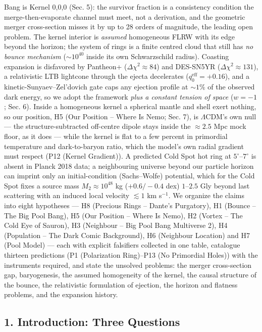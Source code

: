 \documentclass[
  11pt,
]{article}
\begin{document}
Bang is Kernel 0,0,0 (Sec. 5): the survivor fraction is a consistency
condition the merge-then-evaporate channel must meet, not a derivation,
and the geometric merger cross-section misses it by up to 28 orders of
magnitude, the leading open problem. The kernel interior is
\emph{assumed} homogeneous FLRW with its edge beyond the horizon; the
system of rings is a finite centred cloud that still has \emph{no bounce
mechanism} (\(\sim\!10^{40}\) inside its own Schwarzschild radius).
Coasting expansion is disfavored by Pantheon+
(\(\Delta\chi^2 \approx 84\)) and DES-SN5YR
(\(\Delta\chi^2 \approx 131\)), a relativistic LTB lightcone through the
ejecta decelerates (\(q_0^{\text{eff}} = +0.16\)), and a
kinetic-Sunyaev--Zel'dovich gate caps any ejection profile at
\(\sim\!1\%\) of the observed dark energy, so we adopt the framework
\emph{plus a constant tension of space} (\(w=-1\); Sec. 6). Inside a
homogeneous kernel a spherical mantle and shell exert nothing, so our
position, H5 (Our Position -- Where Is Nemo; Sec. 7), is
\(\Lambda\)CDM's own null --- the structure-subtracted off-centre dipole
stays inside the \(\approx 2.5\) Mpc mock floor, as it does --- while
the kernel is flat to a few percent in primordial temperature and
dark-to-baryon ratio, which the model's own radial gradient must respect
(P12 (Kernel Gradient)). A predicted Cold Spot hot ring at
\(5^\circ\)--\(7^\circ\) is absent in Planck 2018 data; a neighbouring
universe beyond our particle horizon can imprint only an
initial-condition (Sachs--Wolfe) potential, which for the Cold Spot
fixes a source mass \(M_2 \approx 10^{48}\) kg (\(+0.6/-0.4\) dex)
\(1\)--\(2.5\) Gly beyond last scattering with an induced local velocity
\(\lesssim 1\) km s\(^{-1}\). We organize the claims into eight
hypotheses --- H8 (Precious Rings -- Dante's Purgatory), H1 (Bounce --
The Big Pool Bang), H5 (Our Position -- Where Is Nemo), H2 (Vortex --
The Cold Eye of Sauron), H3 (Neighbour -- Big Pool Bang Multiverse 2),
H4 (Population -- The Dark Comic Background), H6 (Neighbour Location)
and H7 (Pool Model) --- each with explicit falsifiers collected in one
table, catalogue thirteen predictions (P1 (Polarization Ring)--P13 (No
Primordial Holes)) with the instruments required, and state the unsolved
problems: the merger cross-section gap, baryogenesis, the assumed
homogeneity of the kernel, the causal structure of the bounce, the
relativistic formulation of ejection, the horizon and flatness problems,
and the expansion history.

\hypertarget{introduction-three-questions}{%
\subsection{\texorpdfstring{\textbf{1. Introduction: Three
Questions}}{1. Introduction: Three Questions}}\label{introduction-three-questions}}
\end{document}
